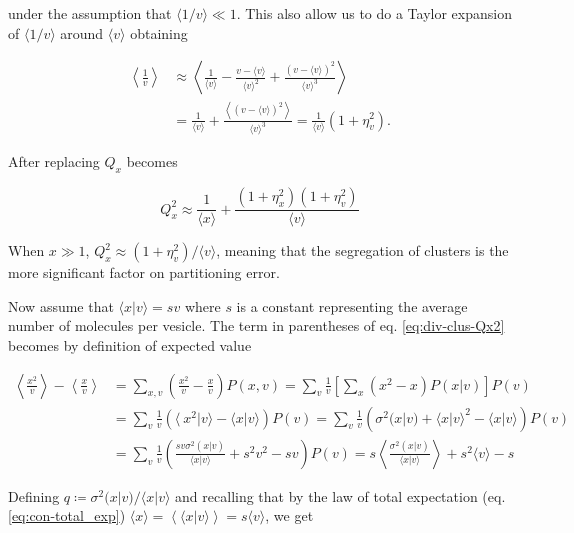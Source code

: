 under the assumption that $\langle 1/v\rangle \ll 1$. This also allow us to do a Taylor expansion of $\langle 1/v\rangle$ around $\langle v\rangle$ obtaining

\begin{equation*}
  \begin{split}
    \left\langle\frac{1}{v}\right\rangle &\approx \left\langle \frac{1}{\langle v\rangle} - \frac{v-\langle v\rangle}{\langle v\rangle^2} + \frac{(v-\langle v\rangle)^2}{\langle v\rangle^3}\right\rangle\\
    &=\frac{1}{\langle v\rangle} + \frac{\left\langle(v-\langle v\rangle)^2\right\rangle}{\langle v\rangle^3} = \frac{1}{\langle v\rangle}\left(1+\eta_v^2\right).
  \end{split}
\end{equation*}

After replacing $Q_x$ becomes

\begin{equation*}
  \boxed{Q_x^2 \approx \frac{1}{\langle x\rangle} + \frac{(1+\eta_x^2)(1+\eta_v^2)}{\langle v\rangle}}
\end{equation*}

When $x\gg 1$, $Q_x^2\approx(1+\eta_v^2)/\langle v\rangle$, meaning that the segregation of clusters is the more significant factor on partitioning error.

Now assume that $\langle x|v\rangle = sv$ where $s$ is a constant representing the average number of molecules per vesicle. The term in parentheses of eq. \eqref{eq:div-clus-Qx2} becomes by definition of expected value

\begin{equation}
  \begin{split}
    \left\langle \frac{x^2}{v}\right\rangle-\left\langle \frac{x}{v}\right\rangle &= \sum_{x,v}\left( \frac{x^2}{v}- \frac{x}{v}\right)P(x,v) = \sum_v\frac{1}{v}\left[\sum_x\left(x^2- x\right)P(x|v)\right]P(v)\\
    &=\sum_v\frac{1}{v}\left(\langle\ x^2|v\rangle - \langle x|v\rangle\right)P(v)=\sum_v\frac{1}{v}\left(\sigma^2(x|v) + \langle x|v\rangle^2-\langle x|v\rangle\right)P(v)\\
    &=\sum_v\frac{1}{v}\left(\frac{sv\sigma^2(x|v)}{\langle x|v\rangle} + s^2v^2-sv\right)P(v) = s\left\langle\frac{\sigma^2(x|v)}{\langle x|v\rangle}\right\rangle + s^2\langle v\rangle - s
  \end{split}
\end{equation}

Defining $q\coloneqq\sigma^2(x|v)/\langle x|v\rangle$ and recalling that by the law of total expectation (eq. \eqref{eq:con-total_exp})  $\langle x\rangle = \left\langle\langle x|v\rangle\right\rangle = s\langle v\rangle$, we get

